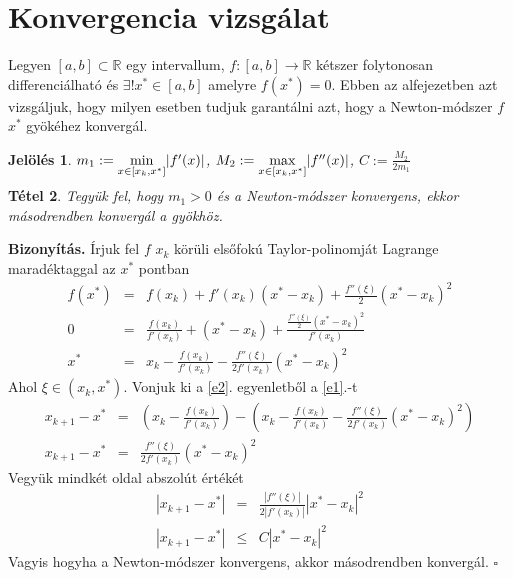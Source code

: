 \documentclass[a4paper,12pt]{report}
\newtheorem{Tet}{Tétel}[section]
\newtheorem{Jel}[Tet]{Jelölés}
\newenvironment{Biz}{\noindent \textbf{Bizonyítás. }}{ $\square$}
\begin{document}
        
        
        
        
        
        
            
        
        
        
        
        
        
        
        
        
        
        
		\section{Konvergencia vizsgálat}
			Legyen $[a,b]\subset{\mathbb R}$ egy intervallum, $f:[a,b]\to {\mathbb R}$ kétszer folytonosan differenciálható és $\exists !x^*\in[a,b]$ amelyre $f(x^*)=0$. Ebben az alfejezetben azt vizsgáljuk, hogy milyen esetben tudjuk garantálni azt, hogy a Newton-módszer $f$ $x^*$ gyökéhez konvergál.
			\begin{Jel}
				$m_1:=\smash{\displaystyle \min_{x \in [x_k,x^*]}} |f'(x)|$, $M_2:=\smash{\displaystyle \max_{x\in [x_k,x^*]}} |f''(x)|$, $C:=\frac{M_2}{2m_1}$
			\end{Jel}
			\begin{Tet}
			\label{t2} Tegyük fel, hogy $m_1>0$ és a Newton-módszer konvergens, ekkor másodrendben konvergál a gyökhöz.
			\end{Tet}
			\begin{Biz}
				Írjuk fel $f$ $x_k$ körüli elsőfokú Taylor-polinomját Lagrange maradéktaggal az $x^*$ pontban 
				\begin{eqnarray}
					f(x^*)&=&f(x_k)+f'(x_k)(x^*-x_{k})+\frac{f''(\xi)}{2}(x^*-x_{k})^2 \\
					0&=&\frac{f(x_k)}{f'(x_k)}+(x^*-x_{k})+\frac{\frac{f''(\xi)}{2}(x^*-x_{k})^2}{f'(x_k)}\\
					\label{e1} x^*&=&x_k-\frac{f(x_k)}{f'(x_k)}-\frac{f''(\xi)}{2f'(x_k)}(x^*-x_{k})^2
				\end{eqnarray}
				Ahol $\xi \in (x_k,x^*)$. Vonjuk ki a \ref{e2}. egyenletből a \ref{e1}.-t
				\begin{eqnarray*}
					x_{k+1}-x^*&=&\left(x_k-\frac{f(x_k)}{f'(x_k)}\right) - \left(x_k-\frac{f(x_k)}{f'(x_k)}-\frac{f''(\xi)}{2f'(x_k)}(x^*-x_{k})^2\right)\\
					x_{k+1}-x^*&=&\frac{f''(\xi)}{2f'(x_k)}(x^*-x_{k})^2
				\end{eqnarray*}
				Vegyük mindkét oldal abszolút értékét
				\begin{eqnarray}
					|x_{k+1}-x^*|&=&\frac{|f''(\xi)|}{2|f'(x_k)|}|x^*-x_{k}|^2 \\
					|x_{k+1}-x^*| &\leq &C|x^*-x_k|^2 \label{e3}
				\end{eqnarray}
				Vagyis hogyha a Newton-módszer konvergens, akkor másodrendben konvergál.
			\end{Biz}
\end{document}
